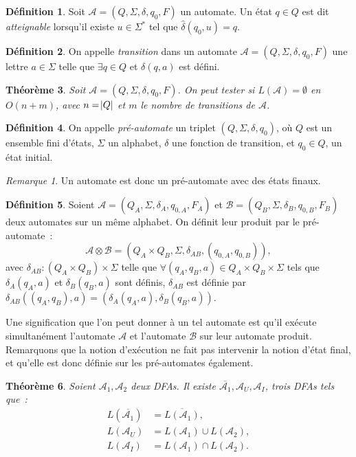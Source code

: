 \documentclass{article}
\newtheorem{thm}{Théorème}[section]
\theoremstyle{definition}
\newtheorem{déf}[thm]{Définition}
\theoremstyle{remark}
\newtheorem*{rmq}{Remarque}
\newcommand{\automaton}{(Q, \Sigma, \delta, q_0, F)}
\begin{document}
	\begin{déf} Soit $\mathcal A = \automaton$ un automate. Un état $q \in Q$ est dit \textit{atteignable} lorsqu'il existe $u \in \Sigma^*$ tel que
	$\hat \delta(q_0, u) = q$.
	\end{déf}

	\begin{déf} On appelle \textit{transition} dans un automate $\mathcal A = \automaton$ une lettre $a \in \Sigma$ telle que $\exists q \in Q $ et $\delta(q, a)$
	est défini.
	\end{déf}

	\begin{thm}\label{thm:langage vide} Soit $\mathcal A = \automaton$. On peut tester si $L(\mathcal A) = \emptyset$ en $O(n + m)$, avec $n = \abs Q$ et $m$
	le nombre de transitions de $\mathcal A$.
	\end{thm}

	\begin{déf} On appelle \textit{pré-automate} un triplet $(Q, \Sigma, \delta, q_0)$, où $Q$ est un ensemble fini d'états, $\Sigma$ un alphabet, $\delta$
	une fonction de transition, et $q_0 \in Q$, un état initial.
	\end{déf}

	\begin{rmq} Un automate est donc un pré-automate avec des états finaux.
	\end{rmq}

	\begin{déf} Soient $\mathcal A = (Q_A, \Sigma, \delta_A, q_{0,A}, F_A)$ et $\mathcal B = (Q_B, \Sigma, \delta_B, q_{0,B}, F_B)$ deux automates
	sur un même alphabet. On définit leur produit par le pré-automate~:
	\[\mathcal A \otimes \mathcal B = (Q_A \times Q_B, \Sigma, \delta_{AB}, (q_{0,A}, q_{0,B})),\]
	avec $\delta_{AB} : (Q_A \times Q_B) \times \Sigma$ telle que $\forall (q_A, q_B, a) \in Q_A \times Q_B \times \Sigma$ tels que
	$\delta_A(q_A, a)$ et $\delta_B(q_B, a)$ sont définis, $\delta_{AB}$ est définie par $\delta_{AB}((q_A, q_B), a) = (\delta_A(q_A, a), \delta_B(q_B, a))$.
	\end{déf}

	Une signification que l'on peut donner à un tel automate est qu'il exécute simultanément l'automate $\mathcal A$ et l'automate $\mathcal B$
	sur leur automate produit. Remarquons que la notion d'exécution ne fait pas intervenir la notion d'état final, et qu'elle est donc définie sur les
	pré-automates également.

	\begin{thm}\label{thm:dérivation automates} Soient $\mathcal A_1, \mathcal A_2$ deux DFAs. Il existe $\overline {\mathcal A_1}, \mathcal A_U, \mathcal A_I$,
	trois DFAs tels que~:
	\begin{align*}
		L(\overline {\mathcal A_1}) &= \overline {L(\mathcal A_1)}, \\
		L(\mathcal A_U) &= L(\mathcal A_1) \cup L(\mathcal A_2), \\
		L(\mathcal A_I) &= L(\mathcal A_1) \cap L(\mathcal A_2).
	\end{align*}
	\end{thm}
\end{document}
